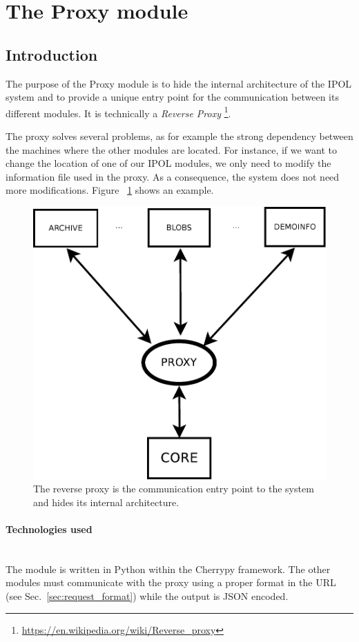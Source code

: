 \section{The Proxy module}

\subsection{Introduction}
\label{sec:proxy_introduction}

The purpose of the Proxy module is to hide the internal architecture of the IPOL system and to provide a unique entry point for the communication between its different modules. It is technically a \emph{Reverse Proxy} \footnote{\url{https://en.wikipedia.org/wiki/Reverse_proxy}}.

The proxy solves several problems, as for example the strong dependency between the machines where the other modules are located. For instance, if we want to change the location of one of our IPOL modules, we only need to modify the information file used in the proxy. As a consequence, the system does not need more modifications. Figure ~\ref{fig:proxy_example} shows an example.

\begin{figure}[!ht]
\centering
\includegraphics[width=0.5\columnwidth]{proxy/images/proxy_diagram.pdf}
\caption{The reverse proxy is the communication entry point to the system and hides its internal architecture.} 
\label{fig:proxy_example}
\end{figure}

\paragraph{Technologies used} \hspace{0pt} \\
The module is written in Python within the Cherrypy framework. The other modules must communicate with the proxy using a proper format in the URL (see Sec.~\ref{sec:request_format}) while the output is JSON encoded.

